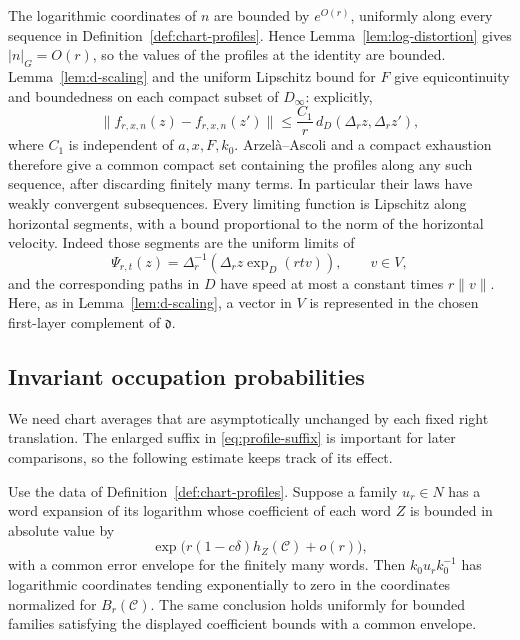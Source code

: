 The logarithmic coordinates of $n$ are bounded by $e^{O(r)}$, uniformly
along every sequence in Definition~\ref{def:chart-profiles}.  Hence
Lemma~\ref{lem:log-distortion} gives $|n|_G=O(r)$, so the values of the
profiles at the identity are bounded.  Lemma~\ref{lem:d-scaling} and the
uniform Lipschitz bound for $F$ give equicontinuity and boundedness on
each compact subset of $D_\infty$: explicitly,
\[
 \|f_{r,x,n}(z)-f_{r,x,n}(z')\|
       \le \frac{C_1}{r}\,d_D(\Delta_r z,\Delta_r z'),
\]
where $C_1$ is independent of $a,x,F,k_0$.  Arzel\`a--Ascoli and a compact
exhaustion therefore give a common compact set containing the profiles
along any such sequence, after discarding finitely many terms.
In particular their laws have weakly convergent subsequences.  Every
limiting function is Lipschitz along horizontal segments, with a bound
proportional to the norm of the horizontal velocity.  Indeed those
segments are the uniform limits of
\begin{equation}\label{eq:actual-profile-segment}
 \Psi_{r,t}(z)=\Delta_r^{-1}(\Delta_r z\exp_D(rt v)),
 \qquad v\in V,
\end{equation}
and the corresponding paths in $D$ have speed at most a constant times
$r\|v\|$.  Here, as in Lemma~\ref{lem:d-scaling}, a vector in $V$ is
represented in the chosen first-layer complement of $\mathfrak d$.

\subsection{Invariant occupation probabilities}

We need chart averages that are asymptotically unchanged by each fixed
right translation.  The enlarged suffix in
\eqref{eq:profile-suffix} is important for later comparisons, so the
following estimate keeps track of its effect.

\begin{lemma}\label{lem:profile-interior-slack}
Use the data of Definition~\ref{def:chart-profiles}.  Suppose a family
$u_r\in N$ has a word expansion of its logarithm whose coefficient of
each word $Z$ is bounded in absolute value by
\[
 \exp\bigl(r(1-c\delta)h_Z(\mathcal C)+o(r)\bigr),
\]
with a common error envelope for the finitely many words.  Then
$k_0u_rk_0^{-1}$ has logarithmic coordinates tending exponentially to
zero in the coordinates normalized for $B_r(\mathcal C)$.
The same conclusion holds uniformly for bounded families satisfying
the displayed coefficient bounds with a common envelope.
\end{lemma}

